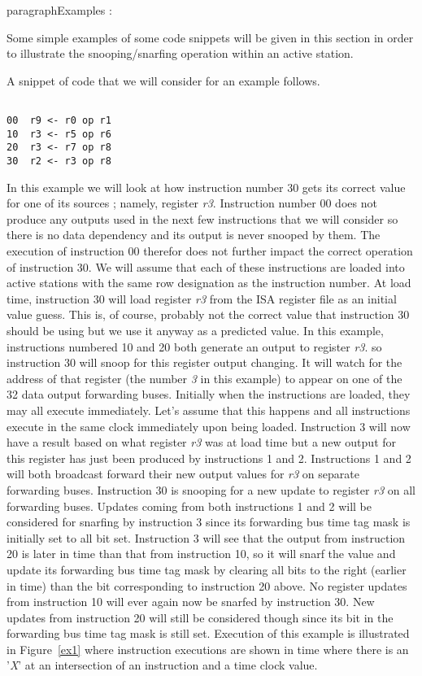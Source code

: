 paragraph{Examples : }

Some simple examples of some code snippets will be 
given in this section in order to illustrate the snooping/snarfing
operation within an active station.

A snippet of code that we will consider for an example
follows.

\begin{verbatim}

00	r9 <- r0 op r1
10	r3 <- r5 op r6
20	r3 <- r7 op r8
30	r2 <- r3 op r8

\end{verbatim}

In this example we will look at how instruction number 30 gets its
correct value for one of its sources ; namely, register
{\it r3}.
Instruction number 00 does not produce
any outputs used in the next few instructions that
we will consider so there is no data dependency and its output 
is never snooped by them.  The execution of instruction 00 therefor
does not further impact the correct operation of instruction 30.
We will assume that each of these
instructions are loaded into active stations with the same row designation
as the instruction number.  
At load time, instruction 30 will
load register
{\it r3}
from the ISA register file as an initial value guess.  
This is, of course,
probably not the correct value that instruction 30 should be using but 
we use it anyway as a predicted value.
In this example, instructions numbered 10 and 20 both generate
an output to register 
{\it r3}.
so instruction 30 will snoop
for this register output changing.  
It will watch for the address
of that register (the number {\it 3} in this example) to
appear on one of the 32 data output forwarding buses.
Initially when the instructions are loaded,
they may all execute immediately.  Let's assume that this happens
and all instructions execute in the same clock immediately upon being
loaded.
Instruction 3 will now have a result based on what register
{\it r3}
was at load time but a new output for this
register has just been produced by instructions 1 and 2.
Instructions 1 and 2 will both broadcast forward their new output
values for
{\it r3}
on separate forwarding buses.
Instruction
30 is snooping for a new update
to register
{\it r3}
on all forwarding buses.  Updates coming from both instructions
1 and 2 will be considered for snarfing by instruction 3 since
its forwarding bus time tag mask is initially set to all bit set.
Instruction 3
will see that the output from instruction 20 is later
in time than that from instruction 10, so it will snarf the value
and update its forwarding bus time tag mask by clearing all bits
to the right (earlier in time) than the bit corresponding to
instruction 20 above.  No register updates from instruction 10
will ever again now be snarfed by instruction 30.  New updates
from instruction 20 will still be considered though since its
bit in the forwarding bus time tag mask is still set.
Execution of this example is illustrated in
Figure~\ref{ex1}
where instruction executions are shown in time where
there is an '{\it X}' at an intersection of an instruction
and a time clock value.


